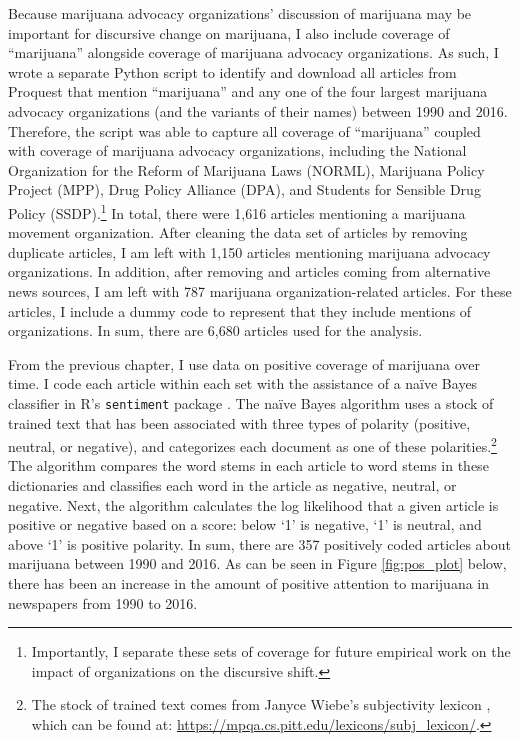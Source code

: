 Because marijuana advocacy organizations' discussion of marijuana may be important for discursive change on marijuana, I also include coverage of ``marijuana'' alongside coverage of marijuana advocacy organizations. As such, I wrote a separate Python script to identify and download all articles from Proquest that mention ``marijuana'' and any one of the four largest marijuana advocacy organizations (and the variants of their names) between 1990 and 2016. Therefore, the script was able to capture all coverage of ``marijuana'' coupled with coverage of marijuana advocacy organizations, including the National Organization for the Reform of Marijuana Laws (NORML), Marijuana Policy Project (MPP), Drug Policy Alliance (DPA), and Students for Sensible Drug Policy (SSDP).\footnote{Importantly, I separate these sets of coverage for future empirical work on the impact of organizations on the discursive shift.} In total, there were 1,616 articles mentioning a marijuana movement organization. After cleaning the data set of articles by removing duplicate articles, I am left with 1,150 articles mentioning marijuana advocacy organizations. In addition, after removing and articles coming from alternative news sources, I am left with 787 marijuana organization-related articles. For these articles, I include a dummy code to represent that they include mentions of organizations. In sum, there are 6,680 articles used for the analysis. 


From the previous chapter, I use data on positive coverage of marijuana over time. I code each article within each set with the assistance of a na\"{i}ve Bayes classifier in \textsf{R}'s \texttt{sentiment} package \citep{jurka_2012}. The na\"{i}ve Bayes algorithm uses a stock of trained text that has been associated with three types of polarity (positive, neutral, or negative), and categorizes each document as one of these polarities.\footnote{The stock of trained text comes from Janyce Wiebe's subjectivity lexicon \citep{wilson_et_al_2005}, which can be found at: \url{https://mpqa.cs.pitt.edu/lexicons/subj_lexicon/}.} The algorithm compares the word stems in each article to word stems in these dictionaries and classifies each word in the article as negative, neutral, or negative. Next, the algorithm calculates the log likelihood that a given article is positive or negative based on a score: below `1' is negative, `1' is neutral, and above `1' is positive polarity.  In sum, there are 357 positively coded articles about marijuana between 1990 and 2016. As can be seen in Figure \ref{fig:pos_plot} below, there has been an increase in the amount of positive attention to marijuana in newspapers from 1990 to 2016.

